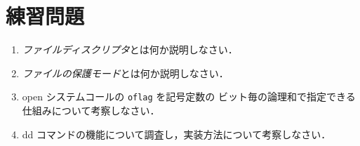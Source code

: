 \newpage
\section*{練習問題}
\begin{enumerate}

\item \emph{ファイルディスクリプタ}とは何か説明しなさい．

\item \emph{ファイルの保護モード}とは何か説明しなさい．

\item open システムコールの \texttt{oflag} を記号定数の
ビット毎の論理和で指定できる仕組みについて考察しなさい．

\item dd コマンドの機能について調査し，実装方法について考察しなさい．
\end{enumerate}
